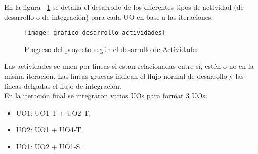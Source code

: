 En la figura ~\ref{fig:grafico-desarrollo-actividades} se detalla el desarrollo de los diferentes tipos de actividad (de desarrollo o de integración) para cada UO en base a las iteraciones.

\begin{figure}[!htbp]
	\texttt{[image: grafico-desarrollo-actividades]}
	\caption{Progreso del proyecto según el desarrollo de Actividades}
	\label{fig:grafico-desarrollo-actividades}
\end{figure}

Las actividades se unen por líneas si estan relacionadas entre sí, estén o no en la misma iteración. Las líneas gruesas indican el flujo normal de desarrollo y las líneas delgadas el flujo de integración.\\

En la iteración final se integraron varios UOs para formar 3 UOs:
\begin{itemize}
\item UO1: UO1-T + UO2-T.
\item UO2: UO1 + UO4-T.
\item UO1: UO2 + UO1-S.
\end{itemize}




